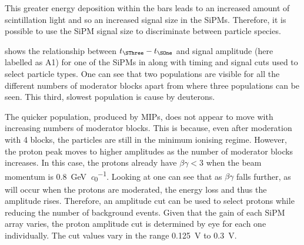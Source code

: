This greater energy deposition within the bars leads to an increased amount of scintillation light and so an increased signal size in the SiPMs.
Therefore, it is possible to use the SiPM signal size to discriminate between particle species.

 shows the relationship between $t_{\SThree} - t_{\SOne}$ and signal amplitude (here labelled as A1) for one of the SiPMs in \SThree along with timing and signal cuts used to select particle types.
One can see that two populations are visible for all the different numbers of moderator blocks apart from  where three populations can be seen.
This third, slowest population is cause by deuterons.

The quicker population, produced by MIPs, does not appear to move with increasing numbers of moderator blocks.
This is because, even after moderation with 4 blocks, the particles are still in the minimum ionising regime.
However, the proton peak moves to higher amplitudes as the number of moderator blocks increases.
In this case, the protons already have $\beta\gamma < 3$ when the beam momentum is \SI{0.8}{\giga\electronvolt\per\clight}.
Looking at  one can see that as $\beta\gamma$ falls further, as will occur when the protons are moderated, the energy loss and thus the amplitude rises.
Therefore, an amplitude cut can be used to select protons while reducing the number of background events.
Given that the gain of each SiPM array varies, the proton amplitude cut is determined by eye for each one individually.
The cut values vary in the range \SI{0.125}{\volt} to \SI{0.3}{\volt}.

